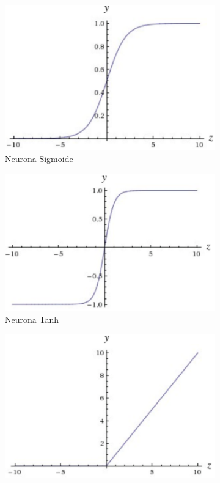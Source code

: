 \begin{figure}[h]
\centering
\begin{subfigure}[b]{.45\linewidth}
\includegraphics[width=\linewidth]{figures/image15.png}
\caption{Neurona Sigmoide}\label{fig:sigm}
\end{subfigure}
\begin{subfigure}[b]{.45\linewidth}
\includegraphics[width=\linewidth]{figures/image16.png}
\caption{Neurona Tanh}\label{fig:tanh}
\end{subfigure}
\begin{subfigure}[b]{.45\linewidth}
\includegraphics[width=\linewidth]{figures/image17.png}

\end{subfigure}
\end{figure}
